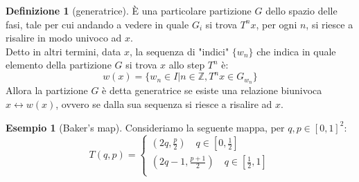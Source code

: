 \documentclass[a4paper,12pt]{article}
\theoremstyle{plain}
\theoremstyle{definition}
\newtheorem{defn}{Definizione}[section]
\newtheorem{exmp}{Esempio}[section]
\newcommand{\f}[2]{\frac{#1}{#2}}
\theoremstyle{remark}
\begin{document}
\begin{defn}[generatrice]
	È una particolare partizione $G$ dello spazio delle fasi, tale per cui andando a vedere in quale $G_i$ si trova $T^{n} x$, per ogni $n$, si riesce a risalire in modo univoco ad $x$. \\Detto in altri termini, data $x$, la sequenza di "indici" $\{w_n\}$ che indica in quale elemento della partizione $G$ si trova $x$ allo step $T^{n}$ è:
	\[w(x)=\{w_n\in I|n\in \mathbb{Z}, T^{n} x\in G_{w_n}\}\]
	Allora la partizione $G$ è detta generatrice se esiste una relazione biunivoca $x\leftrightarrow w(x)$, ovvero se dalla sua sequenza si riesce a risalire ad $x$.
	
\end{defn}

\begin{exmp}[Baker's map]
Consideriamo la seguente mappa, per $q,p\in [0,1]^2$:
\[T(q,p)=\begin{cases}
\left(2q,\f{p}{2}\right)\quad q\in[0,\f{1}{2}]\\

\left(2q-1,\f{p+1}{2}\right)\quad q\in[\f{1}{2},1]\\


\end{cases}
\]


\end{exmp}
\end{document}
